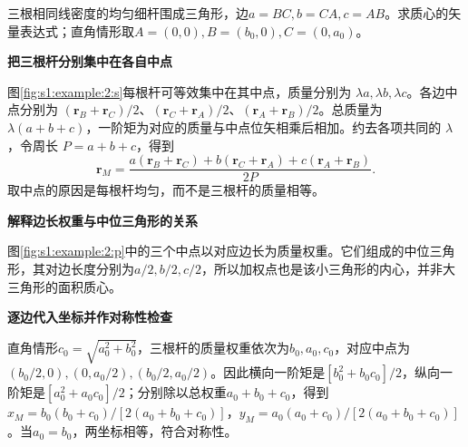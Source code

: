 \begin{question}\begin{example}[三根杆组成的三角框]\label{s1:example:2}
三根相同线密度的均匀细杆围成三角形，边$a=BC,b=CA,c=AB$。求质心的矢量表达式；直角情形取$A=(0,0),B=(b_0,0),C=(0,a_0)$。
\end{example}
\end{question}
\begin{solution}\textbf{把三根杆分别集中在各自中点}\par\nobreak
图\ref{fig:s1:example:2:s}每根杆可等效集中在其中点，质量分别为 $\lambda a,\lambda b,\lambda c$。各边中点分别为 $(\boldsymbol r_B+\boldsymbol r_C)/2$、$(\boldsymbol r_C+\boldsymbol r_A)/2$、$(\boldsymbol r_A+\boldsymbol r_B)/2$。总质量为 $\lambda(a+b+c)$，一阶矩为对应的质量与中点位矢相乘后相加。约去各项共同的 $\lambda$，令周长 $P=a+b+c$，得到
\[
\boldsymbol r_M=\frac{a(\boldsymbol r_B+\boldsymbol r_C)+b(\boldsymbol r_C+\boldsymbol r_A)+c(\boldsymbol r_A+\boldsymbol r_B)}{2P}.
\]
取中点的原因是每根杆均匀，而不是三根杆的质量相等。



\par\medskip{}\noindent\textbf{解释边长权重与中位三角形的关系}\par\nobreak
图\ref{fig:s1:example:2:p}中的三个中点以对应边长为质量权重。它们组成的中位三角形，其对边长度分别为$a/2,b/2,c/2$，所以加权点也是该小三角形的内心，并非大三角形的面积质心。



\par\medskip{}\noindent\textbf{逐边代入坐标并作对称性检查}\par\nobreak
直角情形$c_0=\sqrt{a_0^2+b_0^2}$，三根杆的质量权重依次为$b_0,a_0,c_0$，对应中点为$(b_0/2,0),(0,a_0/2),(b_0/2,a_0/2)$。因此横向一阶矩是$[b_0^2+b_0c_0]/2$，纵向一阶矩是$[a_0^2+a_0c_0]/2$；分别除以总权重$a_0+b_0+c_0$，得到$x_M=b_0(b_0+c_0)/[2(a_0+b_0+c_0)]$，$y_M=a_0(a_0+c_0)/[2(a_0+b_0+c_0)]$。当$a_0=b_0$，两坐标相等，符合对称性。\end{solution}
